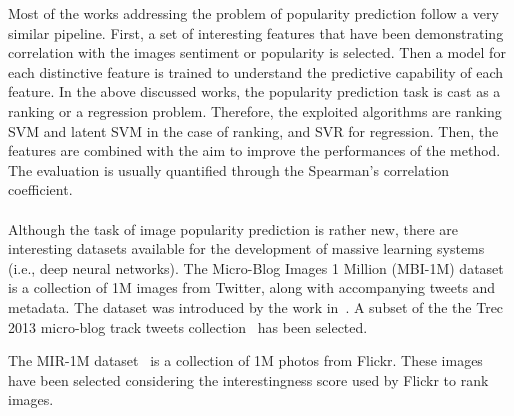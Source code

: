 Most of the works addressing the problem of popularity prediction follow a very similar pipeline. First, a set of interesting features that have been demonstrating correlation with the images sentiment or popularity is selected. Then a model for each distinctive feature is trained to understand the predictive capability of each feature. In the above discussed works, the popularity prediction task is cast as a ranking or a regression problem. Therefore, the exploited algorithms are ranking SVM and latent SVM in the case of ranking, and SVR for regression.  Then, the features are combined with the aim to improve the performances of the method. The evaluation is usually quantified through the Spearman's correlation coefficient.
\\
\\
Although the task of image popularity prediction is rather new, there are interesting datasets available for the development of massive learning systems (i.e., deep neural networks).
The Micro-Blog Images 1 Million (MBI-1M) dataset is a collection of 1M images from Twitter, along with accompanying tweets and metadata. 
The dataset was introduced by the work in~\cite{cappallo2015latent}. A subset of the the Trec 2013 micro-blog track tweets collection~\cite{lin2013overview} has been selected.

The MIR-1M dataset~\cite{huiskes2010new} is a collection of 1M photos from Flickr. These images have been selected considering the interestingness score used by Flickr to rank images.

